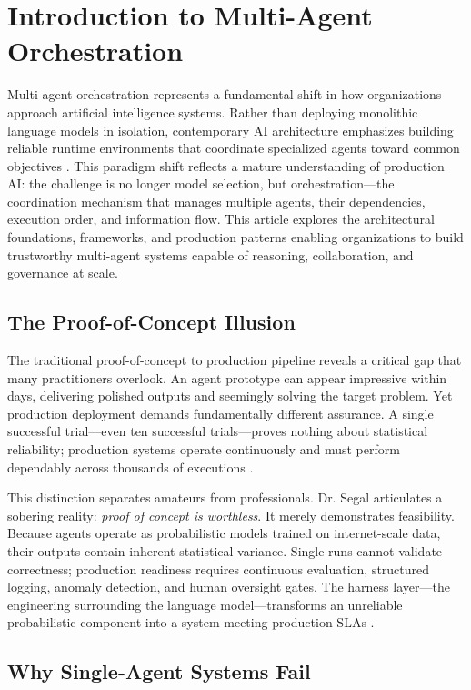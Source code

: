 \chapter{Introduction to Multi-Agent Orchestration}\label{ch:intro}

Multi-agent orchestration represents a fundamental shift in how organizations approach artificial intelligence systems. Rather than deploying monolithic language models in isolation, contemporary AI architecture emphasizes building reliable runtime environments that coordinate specialized agents toward common objectives \cite{Segal2026}. This paradigm shift reflects a mature understanding of production AI: the challenge is no longer model selection, but orchestration—the coordination mechanism that manages multiple agents, their dependencies, execution order, and information flow. This article explores the architectural foundations, frameworks, and production patterns enabling organizations to build trustworthy multi-agent systems capable of reasoning, collaboration, and governance at scale.

\section{The Proof-of-Concept Illusion}

The traditional proof-of-concept to production pipeline reveals a critical gap that many practitioners overlook. An agent prototype can appear impressive within days, delivering polished outputs and seemingly solving the target problem. Yet production deployment demands fundamentally different assurance. A single successful trial—even ten successful trials—proves nothing about statistical reliability; production systems operate continuously and must perform dependably across thousands of executions \cite{Segal2026}.

This distinction separates amateurs from professionals. Dr. Segal articulates a sobering reality: \emph{proof of concept is worthless}. It merely demonstrates feasibility. Because agents operate as probabilistic models trained on internet-scale data, their outputs contain inherent statistical variance. Single runs cannot validate correctness; production readiness requires continuous evaluation, structured logging, anomaly detection, and human oversight gates. The harness layer—the engineering surrounding the language model—transforms an unreliable probabilistic component into a system meeting production SLAs \cite{Segal2026}.

\section{Why Single-Agent Systems Fail}


